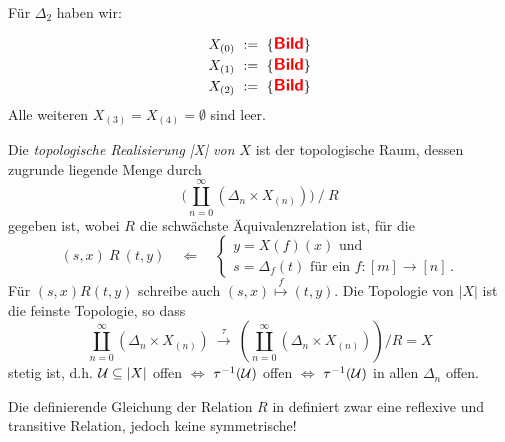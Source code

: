 \begin{beispiel}
  \label{bsp:2-simplex-x}
  Für $\Delta_2$ haben wir:
  \begin{center}
    \begin{minipage}{0.4\textwidth}
      \Bild
      \centering
    \end{minipage}
    \hfill
    \begin{minipage}{0.4\textwidth}
      \begin{align*}
        X_{(0)} \ :=\  \{ \text{\sffamily\bfseries\large \color{red} Bild}\}\\
        X_{(1)} \ :=\  \{ \text{\sffamily\bfseries\large \color{red} Bild}\}\\
        X_{(2)} \ :=\  \{ \text{\sffamily\bfseries\large \color{red} Bild}\}
        \end{align*}
      Alle weiteren $X_{(3)} = X_{(4)} = \emptyset$ sind leer.
    \end{minipage}
  \end{center}
\end{beispiel}

\begin{definition}
  \label{def:top-realisierung}
  Die \emph{topologische Realisierung |X| von $X$} ist der topologische Raum,
  dessen zugrunde liegende Menge durch 
  \[ \Big(\coprod_{n=0}^\infty (\Delta_n \times X_{(n)})\Big)\ \big/ \ R\]
  gegeben ist, wobei $R$ die schwächste Äquivalenzrelation ist, für die
  \[ (s,x)\ R\ (t,y) \quad\Leftarrow\quad \left\{
    \begin{array}{l}
    y = X(f)(x) \text{ und} \\ 
    s = \Delta_f(t) \text{ für ein }f:[m]\to [n]\,.
    \end{array}\right.\] 
  Für $(s,x) R (t,y)$ schreibe auch $(s,x) \overset{f}{\mapsto} (t,y)$.
  Die Topologie von $|X|$ ist die feinste Topologie, so dass
  \[ \coprod_{n=0}^\infty (\Delta_n \times X_{(n)})\ \xrightarrow{\tau}\ 
    \left(\coprod_{n=0}^\infty (\Delta_n \times X_{(n)}) \right)\big/ R = X\]
  stetig ist, d.h. $\mathcal{U} \subseteq |X|$ offen $\Leftrightarrow$ 
  $\tau^{-1}(\mathcal{U})$ offen $\Leftrightarrow$ $\tau^{-1}(\mathcal{U})$ in allen $\Delta_n$
  offen.
\end{definition}


\begin{bemerkung}
  Die definierende Gleichung der Relation $R$ in 
   definiert zwar eine reflexive und transitive
  Relation, jedoch keine symmetrische!
\end{bemerkung}

